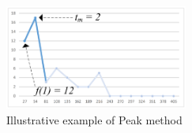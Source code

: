 \begin{figure}[h!]
\centering
\includegraphics[width=6cm]{figure/arrival.png}
\caption{Illustrative example of Peak method}
\label{fig:arrival}
\end{figure}

